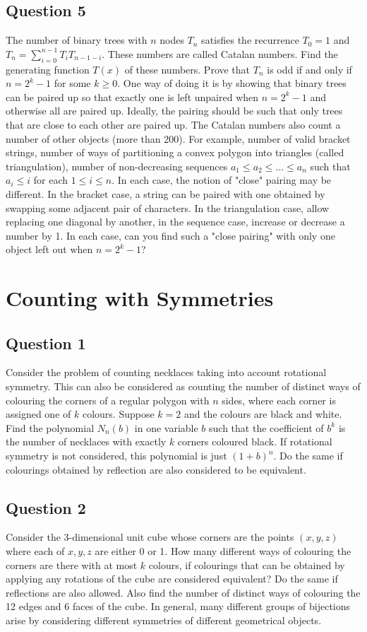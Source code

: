 \documentclass[12pt]{report}
\begin{document}
\section*{Question 5}
The number of binary trees with $n$ nodes $T_{n}$ satisfies the recurrence $T_{0} = 1$ and $T_{n} = \sum\limits_{i = 0}^{n - 1}T_{i}T_{n - 1 - i}$. These numbers are called Catalan numbers. Find the generating function $T(x)$ of these numbers. Prove that $T_{n}$ is odd if and only if $n = 2^{k} - 1$ for some $k \geq 0$.  One way of doing it is by showing that binary trees can be paired up so that exactly one is left unpaired when $n = 2^{k} - 1$ and otherwise all are paired up.  Ideally, the pairing should be such that only trees that are close to each other are paired up. The Catalan numbers also count a number of other objects (more than 200). For example, number of valid bracket strings, number of ways of partitioning a convex polygon into triangles (called triangulation), number of non-decreasing sequences $a_{1} \leq a_{2} \leq \dots \leq a_{n}$ such that $a_{i} \leq i$ for each $1 \leq i \leq n$. In each case, the notion of "close" pairing may be different. In the bracket case, a string can be paired with one obtained by swapping some adjacent pair of characters. In the triangulation case, allow replacing one diagonal by another, in the sequence case, increase or decrease a number by 1. In each case, can you find such a "close pairing" with only one object left out when $n = 2^{k} - 1$?
\chapter{Counting with Symmetries}
\section*{Question 1}
Consider the problem of counting necklaces taking into account rotational symmetry. This can also be considered as counting the number of distinct ways of colouring the corners of a regular polygon with $n$ sides, where each corner is assigned one of $k$ colours. Suppose $k = 2$ and the colours are black and white. Find the polynomial $N_{n}(b)$ in one variable $b$ such that the coefficient of $b^{k}$ is the number of necklaces with exactly $k$ corners coloured black. If rotational symmetry is not considered, this polynomial is just $(1 + b)^n$. Do the same if colourings obtained by reflection are also considered to be equivalent. 
\section*{Question 2}
Consider the 3-dimensional unit cube whose corners are the points $(x, y, z)$ where each of $x, y, z$ are either 0 or 1. How many different ways of colouring the corners are there with at most $k$ colours, if colourings that can be obtained by applying any rotations of the cube are considered equivalent? Do the same if reflections are also allowed. Also find the number of distinct ways of colouring the 12 edges and 6 faces of the cube. In general, many different groups of bijections arise by considering different symmetries of different geometrical objects.
\end{document}

